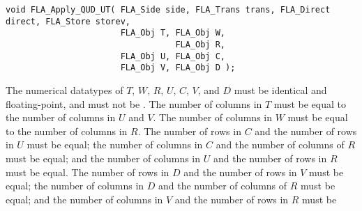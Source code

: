 \begin{flaspec}
\begin{verbatim}
void FLA_Apply_QUD_UT( FLA_Side side, FLA_Trans trans, FLA_Direct direct, FLA_Store storev,
                       FLA_Obj T, FLA_Obj W,
                                  FLA_Obj R,
                       FLA_Obj U, FLA_Obj C,
                       FLA_Obj V, FLA_Obj D );
\end{verbatim}
\begin{checks}
\checkitem
The numerical datatypes of $ T $, $ W $, $ R $, $ U $, $ C $, $ V $, and $ D $
must be identical and floating-point, and must not be \flaconstantns.
\itemvsp
\checkitem
The number of columns in $ T $ must be equal to the number of columns in $ U $
and $ V $.
\itemvsp
\checkitem
The number of columns in $ W $ must be equal to the number of columns in $ R $.
\itemvsp
\checkitem
The number of rows in $ C $ and the number of rows in $ U $ must be equal; the
number of columns in $ C $ and the number of columns of $ R $ must be equal;
and the number of columns in $ U $ and the number of rows in $ R $ must be
equal.
\itemvsp
\checkitem
The number of rows in $ D $ and the number of rows in $ V $ must be equal; the
number of columns in $ D $ and the number of columns of $ R $ must be equal;
and the number of columns in $ V $ and the number of rows in $ R $ must be

\end{checks}
\end{flaspec}
